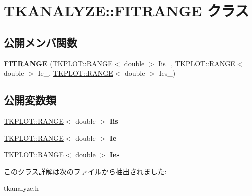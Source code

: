 \hypertarget{class_t_k_a_n_a_l_y_z_e_1_1_f_i_t_r_a_n_g_e}{}\section{T\+K\+A\+N\+A\+L\+Y\+ZE\+:\+:F\+I\+T\+R\+A\+N\+GE クラス}
\label{class_t_k_a_n_a_l_y_z_e_1_1_f_i_t_r_a_n_g_e}
\subsection*{公開メンバ関数}
\begin{DoxyCompactItemize}
\item 
\mbox{\label{class_t_k_a_n_a_l_y_z_e_1_1_f_i_t_r_a_n_g_e_a5c329b0c3f0c0326809c71c460d7cee8}} 
{\bfseries F\+I\+T\+R\+A\+N\+GE} (\hyperlink{class_t_k_p_l_o_t_1_1_r_a_n_g_e}{T\+K\+P\+L\+O\+T\+::\+R\+A\+N\+GE}$<$ double $>$ Iis\+\_\+, \hyperlink{class_t_k_p_l_o_t_1_1_r_a_n_g_e}{T\+K\+P\+L\+O\+T\+::\+R\+A\+N\+GE}$<$ double $>$ Ie\+\_\+, \hyperlink{class_t_k_p_l_o_t_1_1_r_a_n_g_e}{T\+K\+P\+L\+O\+T\+::\+R\+A\+N\+GE}$<$ double $>$ Ies\+\_\+)
\end{DoxyCompactItemize}
\subsection*{公開変数類}
\begin{DoxyCompactItemize}
\item 
\mbox{\label{class_t_k_a_n_a_l_y_z_e_1_1_f_i_t_r_a_n_g_e_ab11e12d473ea08ccf5d5fd46e6cd8e75}} 
\hyperlink{class_t_k_p_l_o_t_1_1_r_a_n_g_e}{T\+K\+P\+L\+O\+T\+::\+R\+A\+N\+GE}$<$ double $>$ {\bfseries Iis}
\item 
\mbox{\label{class_t_k_a_n_a_l_y_z_e_1_1_f_i_t_r_a_n_g_e_ad5e58e58eb386f890c9fab2b6cc47849}} 
\hyperlink{class_t_k_p_l_o_t_1_1_r_a_n_g_e}{T\+K\+P\+L\+O\+T\+::\+R\+A\+N\+GE}$<$ double $>$ {\bfseries Ie}
\item 
\mbox{\label{class_t_k_a_n_a_l_y_z_e_1_1_f_i_t_r_a_n_g_e_afee8e472d8fbb46d3112b0b6ba0f2edd}} 
\hyperlink{class_t_k_p_l_o_t_1_1_r_a_n_g_e}{T\+K\+P\+L\+O\+T\+::\+R\+A\+N\+GE}$<$ double $>$ {\bfseries Ies}
\end{DoxyCompactItemize}


このクラス詳解は次のファイルから抽出されました\+:\begin{DoxyCompactItemize}
\item 
tkanalyze.\+h\end{DoxyCompactItemize}
